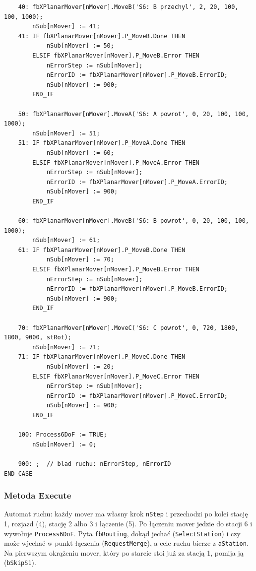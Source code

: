 \documentclass[11pt,a4paper]{report}
\newcommand{\podpodrozdzial}[1]{\subsubsection*{#1}\addcontentsline{toc}{subsubsection}{#1}}
\begin{document}
{\begin{verbatim}
    40: fbXPlanarMover[nMover].MoveB('S6: B przechyl', 2, 20, 100, 100, 1000);
        nSub[nMover] := 41;
    41: IF fbXPlanarMover[nMover].P_MoveB.Done THEN
            nSub[nMover] := 50;
        ELSIF fbXPlanarMover[nMover].P_MoveB.Error THEN
            nErrorStep := nSub[nMover];
            nErrorID := fbXPlanarMover[nMover].P_MoveB.ErrorID;
            nSub[nMover] := 900;
        END_IF

    50: fbXPlanarMover[nMover].MoveA('S6: A powrot', 0, 20, 100, 100, 1000);
        nSub[nMover] := 51;
    51: IF fbXPlanarMover[nMover].P_MoveA.Done THEN
            nSub[nMover] := 60;
        ELSIF fbXPlanarMover[nMover].P_MoveA.Error THEN
            nErrorStep := nSub[nMover];
            nErrorID := fbXPlanarMover[nMover].P_MoveA.ErrorID;
            nSub[nMover] := 900;
        END_IF

    60: fbXPlanarMover[nMover].MoveB('S6: B powrot', 0, 20, 100, 100, 1000);
        nSub[nMover] := 61;
    61: IF fbXPlanarMover[nMover].P_MoveB.Done THEN
            nSub[nMover] := 70;
        ELSIF fbXPlanarMover[nMover].P_MoveB.Error THEN
            nErrorStep := nSub[nMover];
            nErrorID := fbXPlanarMover[nMover].P_MoveB.ErrorID;
            nSub[nMover] := 900;
        END_IF

    70: fbXPlanarMover[nMover].MoveC('S6: C powrot', 0, 720, 1800, 1800, 9000, stRot);
        nSub[nMover] := 71;
    71: IF fbXPlanarMover[nMover].P_MoveC.Done THEN
            nSub[nMover] := 20;
        ELSIF fbXPlanarMover[nMover].P_MoveC.Error THEN
            nErrorStep := nSub[nMover];
            nErrorID := fbXPlanarMover[nMover].P_MoveC.ErrorID;
            nSub[nMover] := 900;
        END_IF

    100: Process6DoF := TRUE;
        nSub[nMover] := 0;

    900: ;  // blad ruchu: nErrorStep, nErrorID
END_CASE
\end{verbatim}}

\podpodrozdzial{Metoda Execute}
Automat ruchu: każdy mover ma własny krok \texttt{nStep} i przechodzi po kolei stację 1, rozjazd (4), stację 2 albo 3 i łączenie (5). Po łączeniu mover jedzie do stacji 6 i wywołuje \texttt{Process6DoF}. Pyta \texttt{fbRouting}, dokąd jechać (\texttt{SelectStation}) i czy może wjechać w punkt łączenia (\texttt{RequestMerge}), a cele ruchu bierze z \texttt{aStation}. Na pierwszym okrążeniu mover, który po starcie stoi już za stacją 1, pomija ją (\texttt{bSkipS1}).
\end{document}
